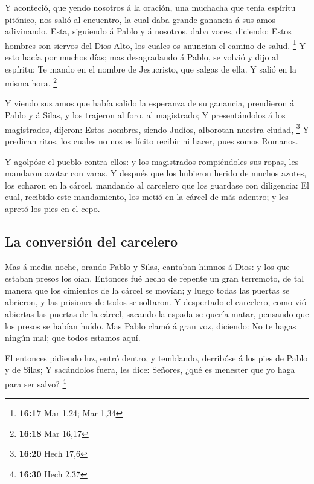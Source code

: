  Y aconteció, que yendo nosotros á la oración, una muchacha
que tenía espíritu pitónico, nos salió al encuentro, la cual daba grande
ganancia á sus amos adivinando.  Esta, siguiendo á Pablo y
á nosotros, daba voces, diciendo: Estos hombres son siervos del Dios
Alto, los cuales os anuncian el camino de salud. \footnote{\textbf{16:17}
  Mar 1,24; Mar 1,34}  Y esto hacía por muchos días; mas
desagradando á Pablo, se volvió y dijo al espíritu: Te mando en el
nombre de Jesucristo, que salgas de ella. Y salió en la misma hora.
\footnote{\textbf{16:18} Mar 16,17}

 Y viendo sus amos que había salido la esperanza de su
ganancia, prendieron á Pablo y á Silas, y los trajeron al foro, al
magistrado;  Y presentándolos á los magistrados, dijeron:
Estos hombres, siendo Judíos, alborotan nuestra ciudad, \footnote{\textbf{16:20}
  Hech 17,6}  Y predican ritos, los cuales no nos es lícito
recibir ni hacer, pues somos Romanos.

 Y agolpóse el pueblo contra ellos: y los magistrados
rompiéndoles sus ropas, les mandaron azotar con varas.  Y
después que los hubieron herido de muchos azotes, los echaron en la
cárcel, mandando al carcelero que los guardase con diligencia:
 El cual, recibido este mandamiento, los metió en la cárcel
de más adentro; y les apretó los pies en el cepo.

\hypertarget{la-conversiuxf3n-del-carcelero}{%
\subsection{La conversión del
carcelero}\label{la-conversiuxf3n-del-carcelero}}

 Mas á media noche, orando Pablo y Silas, cantaban himnos á
Dios: y los que estaban presos los oían.  Entonces fué
hecho de repente un gran terremoto, de tal manera que los cimientos de
la cárcel se movían; y luego todas las puertas se abrieron, y las
prisiones de todos se soltaron.  Y despertado el carcelero,
como vió abiertas las puertas de la cárcel, sacando la espada se quería
matar, pensando que los presos se habían huído.  Mas Pablo
clamó á gran voz, diciendo: No te hagas ningún mal; que todos estamos
aquí.

 El entonces pidiendo luz, entró dentro, y temblando,
derribóse á los pies de Pablo y de Silas;  Y sacándolos
fuera, les dice: Señores, ¿qué es menester que yo haga para ser salvo?
\footnote{\textbf{16:30} Hech 2,37}

